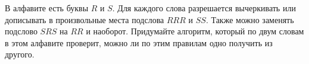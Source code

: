 В алфавите есть буквы $R$ и $S$. Для каждого слова разрешается вычеркивать или дописывать в произвольные места подслова $RRR$
и $SS$. Также можно заменять подслово $SRS$ на $RR$ и наоборот. Придумайте алгоритм, который по двум словам в этом алфавите
проверит, можно ли по этим правилам одно получить из другого.
